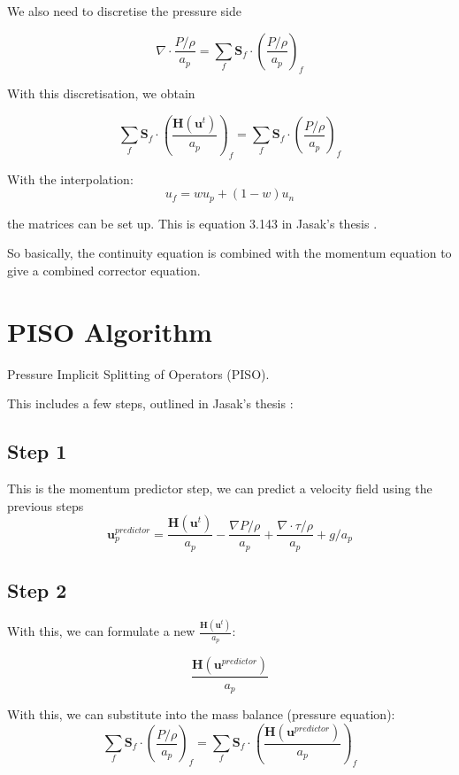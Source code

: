 \documentclass[masters]{ucbthesis}
\renewcommand{\_}{\kern-1.5pt\textunderscore\kern-1.5pt}
\begin{document}
We also need to discretise the pressure side

$$
\nabla \cdot \frac{P/\rho}{a_p}
= 
\sum_f \textbf{S}_f \cdot
\left( 
	\frac{P/\rho}{a_p}
\right)_f
$$

With this discretisation, we obtain

$$
\sum_f \textbf{S}_f \cdot
\left( 
	\frac{\textbf{H}(\textbf{u}^t)}{a_p}
\right)_f
= 
\sum_f \textbf{S}_f \cdot
\left( 
	\frac{P/\rho}{a_p}
\right)_f
$$

With the interpolation:
$$ u_f = w u_p + (1-w) u_n $$

the matrices can be set up.
This is equation 3.143 in Jasak's thesis \citep{jasak1996error}.

So basically, the continuity equation is combined with the momentum 
equation to give a combined corrector equation.

\section{PISO Algorithm}

Pressure Implicit Splitting of Operators (PISO).

This includes a few steps, outlined in Jasak's thesis \citep{jasak1996error}:

\subsection{Step 1}

This is the momentum predictor step, we can predict a velocity field 
using the previous steps
\begin{equation}
	\textbf{u}_p^{predictor} = \frac{\textbf{H}(\textbf{u}^t)}{a_p}
	- \frac{\nabla P/\rho}{a_p}
	+ \frac{\nabla \cdot \tau /\rho}{a_p}
	+ g/a_p
\end{equation}

\subsection{Step 2}

With this, we can formulate a new $\frac{\textbf{H}(\textbf{u}^t)}{a_p}$:

\begin{equation}
	\frac{\textbf{H}(\textbf{u}^{predictor})}{a_p}
\end{equation}

With this, we can substitute into the mass balance (pressure equation):
$$
\sum_f \textbf{S}_f \cdot
\left( 
	\frac{P/\rho}{a_p}
\right)_f
=
\sum_f \textbf{S}_f \cdot
\left( 
	\frac{\textbf{H}(\textbf{u}^{predictor})}{a_p}
\right)_f
$$
\end{document}
